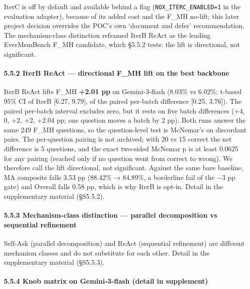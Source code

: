 \documentclass[
]{article}
\begin{document}
IterC is off by default and available behind a flag
(\texttt{NOX\_ITERC\_ENABLED=1} in the evaluation adapter), because of
its added cost and the F\_MH no-lift; this later project decision
overrides the POC's own `document and defer' recommendation. The
mechanism-class distinction reframed IterB ReAct as the leading
EverMemBench F\_MH candidate, which §5.5.2 tests: the lift is
directional, not significant.

\paragraph{5.5.2 IterB ReAct --- directional F\_MH lift on the best
backbone}\label{iterb-react-directional-f_mh-lift-on-the-best-backbone}

IterB ReAct lifts F\_MH \textbf{+2.01 pp} on Gemini-3-flash (8.03\% vs
6.02\%; t-based 95\% CI of IterB {[}6.27, 9.79{]}, of the paired
per-batch difference {[}0.25, 3.76{]}). The paired per-batch interval
excludes zero, but it rests on five batch differences (+4, 0, +2, +2,
+2.04 pp; one question moves a batch by 2 pp). Both runs answer the same
249 F\_MH questions, so the question-level test is McNemar's on
discordant pairs. The per-question pairing is not archived; with 20 vs
15 correct the net difference is 5 questions, and the exact two-sided
McNemar p is at least 0.0625 for any pairing (reached only if no
question went from correct to wrong). We therefore call the lift
directional, not significant. Against the same bare baseline, MA
composite falls 3.53 pp (88.42\% → 84.89\%, a borderline fail of the −3
pp gate) and Overall falls 0.58 pp, which is why IterB is opt-in. Detail
in the supplementary material (§S5.5.2).

\paragraph{5.5.3 Mechanism-class distinction --- parallel decomposition
vs sequential
refinement}\label{mechanism-class-distinction-parallel-decomposition-vs-sequential-refinement}

Self-Ask (parallel decomposition) and ReAct (sequential refinement) are
different mechanism classes and do not substitute for each other. Detail
in the supplementary material (§S5.5.3).

\paragraph{5.5.4 Knob matrix on Gemini-3-flash (detail in
supplement)}\label{knob-matrix-on-gemini-3-flash-detail-in-supplement}
\end{document}
